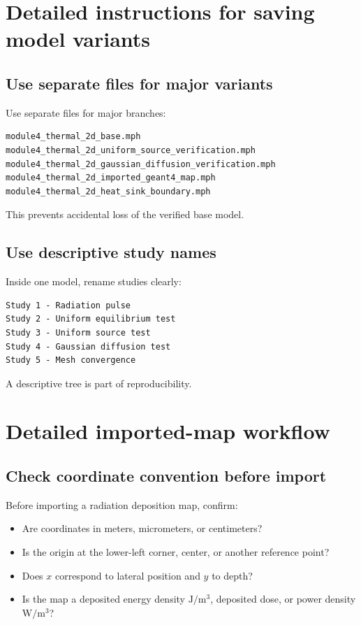 \documentclass[11pt]{article}
\newcommand{\type}[1]{\texttt{\detokenize{#1}}}
\begin{document}
\section{Detailed instructions for saving model variants}

\subsection{Use separate files for major variants}
Use separate \type{.mph} files for major branches:
\begin{lstlisting}
module4_thermal_2d_base.mph
module4_thermal_2d_uniform_source_verification.mph
module4_thermal_2d_gaussian_diffusion_verification.mph
module4_thermal_2d_imported_geant4_map.mph
module4_thermal_2d_heat_sink_boundary.mph
\end{lstlisting}
This prevents accidental loss of the verified base model.

\subsection{Use descriptive study names}
Inside one model, rename studies clearly:
\begin{lstlisting}
Study 1 - Radiation pulse
Study 2 - Uniform equilibrium test
Study 3 - Uniform source test
Study 4 - Gaussian diffusion test
Study 5 - Mesh convergence
\end{lstlisting}
A descriptive tree is part of reproducibility.

\section{Detailed imported-map workflow}

\subsection{Check coordinate convention before import}
Before importing a radiation deposition map, confirm:
\begin{itemize}
\item Are coordinates in meters, micrometers, or centimeters?
\item Is the origin at the lower-left corner, center, or another reference point?
\item Does \(x\) correspond to lateral position and \(y\) to depth?
\item Is the map a deposited energy density \(\mathrm{J/m^3}\), deposited dose, or power density \(\mathrm{W/m^3}\)?
\end{itemize}
\end{document}
